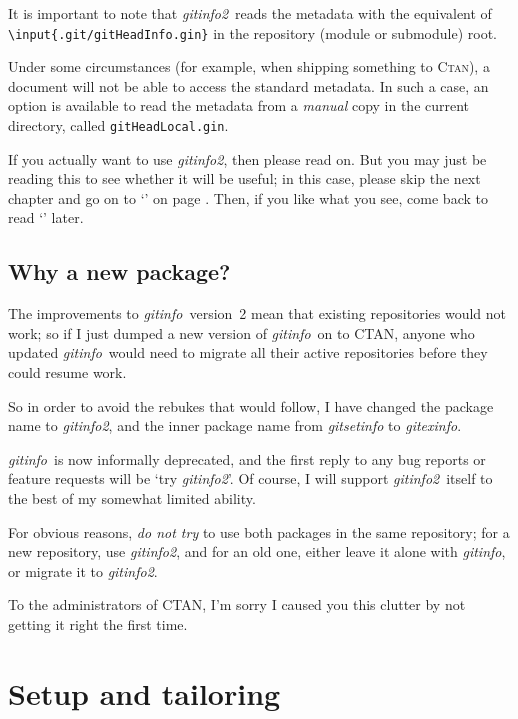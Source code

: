 \documentclass[a4paper,12pt,twoside,openany]{memoir}
\newcommand{\sfit}[1]{\textit{#1}}
\newcommand{\opname}{\sfit{gitinfo}}
\newcommand{\tpname}{\sfit{gitinfo2}}
\newcommand{\ginname}{gitHeadInfo.gin}
\newcommand{\locname}{\texttt{gitHeadLocal.gin}}
\newcommand{\metapath}{\texttt{.git/\ginname}}
\begin{document}
It is important to note that \tpname\ reads the metadata
with the equivalent of \texttt{\textbackslash input\{\metapath\}}
in the repository (module or submodule) root.

Under some circumstances 
(for example, when shipping something to \textsc{Ctan}),
a document will not be able to access the standard metadata.
In such a case, an option is available to read the metadata 
from a \emph{manual} copy in the current directory, 
called \locname. 

If you actually want to use \tpname, then please read on.
But you may just be reading this to see whether it will be useful;
in this case,
please skip the next chapter and go on to `'
on page \pageref*{ch:using}.
Then, if you like what you see, come back to
read `' later.

\clearpage
\section{Why a new package?}

The improvements to \opname\ version~2 mean that
existing repositories would not work;
so if I just dumped a new version of \opname\
on to CTAN, anyone who updated \opname\
would need to migrate all their active repositories
before they could resume work.

So in order to avoid the rebukes that would follow,
I have changed the package name to \tpname,
and the inner package name from \sfit{gitsetinfo}
to \sfit{gitexinfo}.

\opname\ is now informally deprecated,
and the first reply to any bug reports or feature requests
will be `try \tpname'.
Of course, I will support \tpname\ itself
to the best of my somewhat limited ability.

For obvious reasons, \emph{do not try}
to use both packages in the same repository;
for a new repository, use \tpname,
and for an old one, either leave it alone with \opname,
or migrate it to \tpname.

To the administrators of CTAN,
I'm sorry I caused you this clutter
by not getting it right the first time.

\chapter{Setup and tailoring}
\label{ch:setup}
\end{document}
